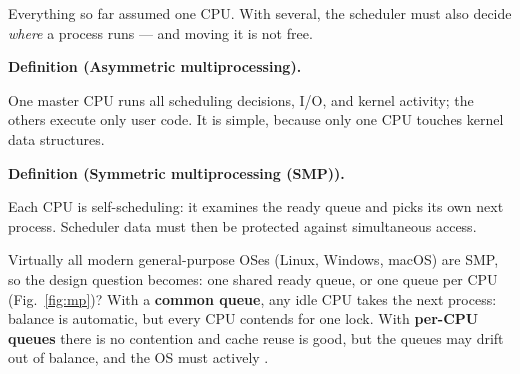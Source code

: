 \documentclass[11pt]{article}
\newenvironment{definitionbox}[1]{%
  \par\noindent\textbf{Definition (#1).}\ \itshape
}{\par\vspace{0.3em}}
\begin{document}
\noindent{}

\medskip
Everything so far assumed one CPU. With several, the scheduler must also decide \emph{where} a process runs --- and moving it is not free.

\begin{definitionbox}{Asymmetric multiprocessing}
One master CPU runs all scheduling decisions, I/O, and kernel activity; the others execute only user code. It is simple, because only one CPU touches kernel data structures.
\end{definitionbox}
\begin{definitionbox}{Symmetric multiprocessing (SMP)}
Each CPU is self-scheduling: it examines the ready queue and picks its own next process. Scheduler data must then be protected against simultaneous access.
\end{definitionbox}

Virtually all modern general-purpose OSes (Linux, Windows, macOS) are SMP, so the design question becomes: one shared ready queue, or one queue per CPU (Fig.~\ref{fig:mp})? With a \textbf{common queue}, any idle CPU takes the next process: balance is automatic, but every CPU contends for one lock. With \textbf{per-CPU queues} there is no contention and cache reuse is good, but the queues may drift out of balance, and the OS must actively .
\end{document}
